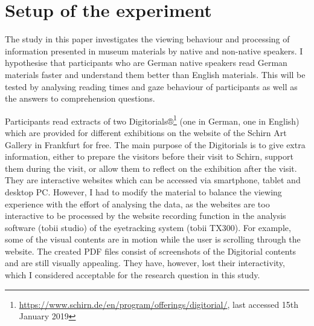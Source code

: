 \documentclass[output=paper]{langscibook}
\begin{document}
\section{Setup of the experiment}

The study in this paper investigates the viewing behaviour and processing of information presented in museum materials by native and non-native speakers. I hypothesise that participants who are German native speakers read German materials faster and understand them better than English materials. This will be tested by analysing reading times and gaze behaviour of participants as well as the answers to comprehension questions. 

Participants read extracts of two Digitorials®\footnote{\url{https://www.schirn.de/en/program/offerings/digitorial/}, last accessed 15th January 2019} (one in German, one in English) which are provided for different exhibitions on the website of the Schirn Art Gallery in Frankfurt for free. The main purpose of the Digitorials is to give extra information, either to prepare the visitors before their visit to Schirn, support them during the visit, or allow them to reflect on the exhibition after the visit. They are interactive websites which can be accessed via smartphone, tablet and desktop PC. However, I had to modify the material to balance the viewing experience with the effort of analysing the data, as the websites are too interactive to be processed by the website recording function in the analysis software (tobii studio) of the eyetracking system (tobii TX300). For example, some of the visual contents are in motion while the user is scrolling through the website. The created PDF files consist of screenshots of the Digitorial contents and are still visually appealing. They have, however, lost their interactivity, which I considered acceptable for the research question in this study.
\end{document}
